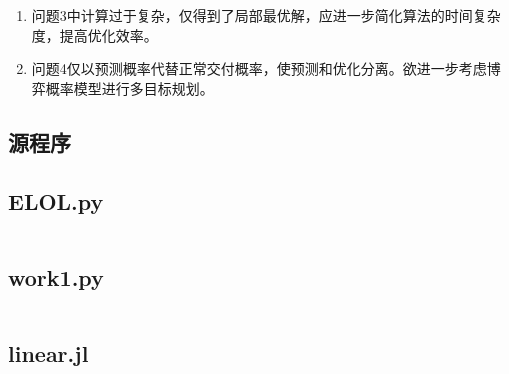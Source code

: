 \begin{enumerate}
    \item 问题3中计算过于复杂，仅得到了局部最优解，应进一步简化算法的时间复杂度，提高优化效率。
    \item 问题4仅以预测概率代替正常交付概率，使预测和优化分离。欲进一步考虑博弈概率模型进行多目标规划。
\end{enumerate}




\printbibliography
\newpage
\begin{appendices}

\section{源程序}


\subsection{ELOL.py} %
\begin{lstlisting}[language=python]

\end{lstlisting}

\subsection{work1.py}

\begin{lstlisting}[language=python]


\end{lstlisting}

\subsection{linear.jl}

\begin{lstlisting}

\end{lstlisting}
\end{appendices}